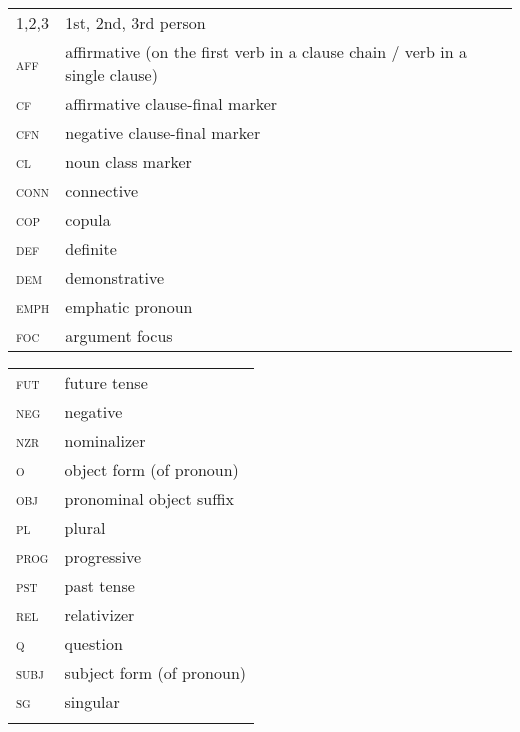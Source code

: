 \documentclass[output=paper]{langsci/langscibook}
\begin{document}
\begin{tabularx}{.55\textwidth}{lQ}
1,2,3 &   1st, 2nd, 3rd person    \\
\textsc{aff} & affirmative (on the first verb in a clause chain / verb in a single clause)\\
\textsc{cf} &  affirmative clause-final marker\\
\textsc{cfn} & negative clause-final marker\\
\textsc{cl} & noun class marker\\
\textsc{conn} & connective\\
\textsc{cop} & copula\\
\textsc{def} & definite\\
\textsc{dem} & demonstrative\\
\textsc{emph} & emphatic pronoun\\
\textsc{foc} & argument focus\\
\end{tabularx}
\begin{tabularx}{.45\textwidth}{lX}
\textsc{fut} & future tense\\
\textsc{neg} & negative\\
\textsc{nzr} & nominalizer\\
\textsc{o} & object form (of pronoun)\\
\textsc{obj} & pronominal object suffix\\
\textsc{pl} & plural\\
\textsc{prog} & progressive\\
\textsc{pst} & past tense\\
\textsc{rel} & relativizer\\
\textsc{q} & question\\
\textsc{subj} & subject form (of pronoun)\\
\textsc{sg} & singular\\
\\
\end{tabularx}

\printbibliography[heading=subbibliography,notkeyword=this]
\end{document}
